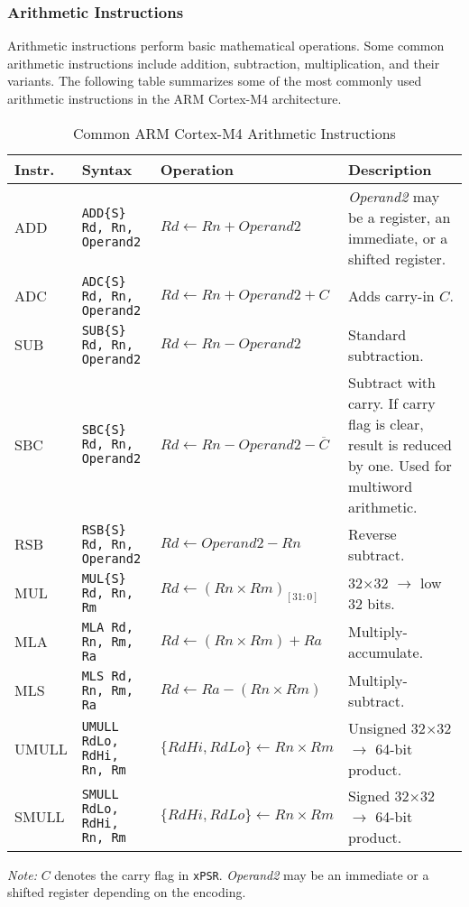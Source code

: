 \subsubsection{Arithmetic Instructions}
Arithmetic instructions perform basic mathematical operations. Some common arithmetic instructions include addition, subtraction, multiplication, and their variants. The following table summarizes some of the most commonly used arithmetic instructions in the ARM Cortex-M4 architecture.
\begin{table}[H]
\centering
\caption{Common ARM Cortex-M4 Arithmetic Instructions}
\small
\begin{tabularx}{\linewidth}{@{}l l l X@{}}
\toprule
\textbf{Instr.} & \textbf{Syntax} & \textbf{Operation} & \textbf{Description} \\
\midrule
ADD  & \texttt{ADD\{S\} Rd, Rn, Operand2}
     & $Rd \leftarrow Rn + Operand2$
     & \emph{Operand2} may be a register, an immediate, or a shifted register. \\
ADC  & \texttt{ADC\{S\} Rd, Rn, Operand2}
     & $Rd \leftarrow Rn + Operand2 + C$
     & Adds carry-in $C$. \\
SUB  & \texttt{SUB\{S\} Rd, Rn, Operand2}
     & $Rd \leftarrow Rn - Operand2$
     & Standard subtraction. \\
SBC  & \texttt{SBC\{S\} Rd, Rn, Operand2}
    & $Rd \leftarrow Rn - Operand2 - \overline{C}$
    & Subtract with carry. If carry flag is clear, result is reduced by one. Used for multiword arithmetic. \\
RSB  & \texttt{RSB\{S\} Rd, Rn, Operand2}
     & $Rd \leftarrow Operand2 - Rn$
     & Reverse subtract. \\
MUL  & \texttt{MUL\{S\} Rd, Rn, Rm}
     & $Rd \leftarrow (Rn \times Rm)_{[31{:}0]}$
     & 32$\times$32 $\rightarrow$ low 32 bits. \\
MLA  & \texttt{MLA Rd, Rn, Rm, Ra}
     & $Rd \leftarrow (Rn \times Rm) + Ra$
     & Multiply-accumulate. \\
MLS  & \texttt{MLS Rd, Rn, Rm, Ra}
     & $Rd \leftarrow Ra - (Rn \times Rm)$
     & Multiply-subtract. \\
UMULL & \texttt{UMULL RdLo, RdHi, Rn, Rm}
      & $\{RdHi,RdLo\} \leftarrow Rn \times Rm$
      & Unsigned 32$\times$32 $\rightarrow$ 64-bit product. \\
SMULL & \texttt{SMULL RdLo, RdHi, Rn, Rm}
      & $\{RdHi,RdLo\} \leftarrow Rn \times Rm$
      & Signed 32$\times$32 $\rightarrow$ 64-bit product. \\
\bottomrule
\end{tabularx}

\vspace{2pt}
\footnotesize\emph{Note:} $C$ denotes the carry flag in \texttt{xPSR}. \emph{Operand2} may be an immediate or a shifted register depending on the encoding.
\end{table} 
